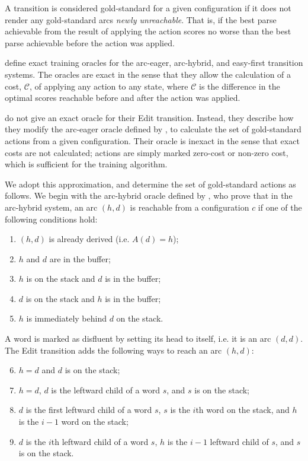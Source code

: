 \documentclass[11pt,letterpaper]{article}
\begin{document}
A transition is considered gold-standard for a given configuration if it does
not render any gold-standard arcs \emph{newly unreachable}.  That is, if the
best parse achievable from the result of applying the action scores no worse
than the best parse achievable before the action was applied. 

\citet{goldberg:13} define exact training oracles for the arc-eager, arc-hybrid,
and easy-first transition systems. The oracles are exact in the sense that they
allow the calculation of a cost, $\mathcal{C}$, of applying any action to any state, where
$\mathcal{C}$ is the difference in the optimal scores reachable before and after the action
was applied.

\citet{honnibal:14} do not give an exact oracle for their Edit transition. Instead,
they describe how they modify the arc-eager oracle defined by \citet{goldberg:12},
to calculate the set of gold-standard actions from a given configuration.  Their
oracle is inexact in the sense that exact costs are not calculated; actions are
simply marked zero-cost or non-zero cost, which is sufficient for the training
algorithm.

We adopt this approximation, and determine the set of gold-standard actions
as follows.  We begin with the arc-hybrid oracle defined by \citet{goldberg:13},
who prove that in the arc-hybrid system, an arc $(h, d)$ is reachable from a
configuration $c$ if one of the following conditions hold:

\begin{enumerate}
    \item $(h, d)$ is already derived (i.e. $A(d)=h$);
    \item $h$ and $d$ are in the buffer;
    \item $h$ is on the stack and $d$ is in the buffer;
    \item $d$ is on the stack and $h$ is in the buffer;
    \item $h$ is immediately behind $d$ on the stack.
\end{enumerate}

\noindent A word is marked as disfluent by setting its head to itself, i.e. it is an arc
$(d, d)$.  
The Edit transition adds the following ways to reach an arc $(h, d)$:

\begin{enumerate}
    \setcounter{enumi}{5}
    \item $h=d$ and $d$ is on the stack;
    \item $h=d$, $d$ is the leftward child of a word $s$, and $s$ is on the stack;
    \item $d$ is the first leftward child of a word $s$, $s$ is the $i$th word
          on the stack, and $h$ is the $i-1$ word on the stack;
    \item $d$ is the $i$th leftward child of a word $s$, $h$ is the $i-1$
          leftward child of $s$, and $s$ is on the stack.
\end{enumerate}
\end{document}
